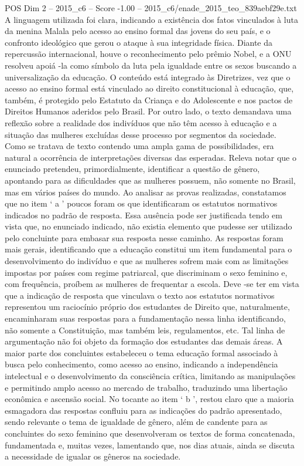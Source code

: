 \begin{textsample}{POS Dim 2 – 2015\_c6 – Score -1.00 – 2015\_c6/enade\_2015\_teo\_839aebf29e.txt}
A linguagem utilizada foi clara, indicando a existência dos fatos vinculados à luta da menina Malala pelo acesso ao ensino formal das jovens do seu país, e o confronto ideológico que gerou o ataque à sua integridade física.
Diante da repercussão internacional, houve o reconhecimento pelo prêmio Nobel, e a ONU resolveu apoiá -la como símbolo da luta pela igualdade entre os sexos buscando a universalização da educação.
O conteúdo está integrado às Diretrizes, vez que o acesso ao ensino formal está vinculado ao direito constitucional à educação, que, também, é protegido pelo Estatuto da Criança e do Adolescente e nos pactos de Direitos Humanos aderidos pelo Brasil.
Por outro lado, o texto demandava uma reflexão sobre a realidade dos indivíduos que não têm acesso à educação e a situação das mulheres excluídas desse processo por segmentos da sociedade.
Como se tratava de texto contendo uma ampla gama de possibilidades, era natural a ocorrência de interpretações diversas das esperadas.
Releva notar que o enunciado pretendeu, primordialmente, identificar a questão de gênero, apontando para as dificuldades que as mulheres possuem, não somente no Brasil, mas em vários países do mundo.
Ao analisar as provas realizadas, constatamos que no item ‘ a ’ poucos foram os que identificaram os estatutos normativos indicados no padrão de resposta.
Essa ausência pode ser justificada tendo em vista que, no enunciado indicado, não existia elemento que pudesse ser utilizado pelo concluinte para embasar sua resposta nesse caminho.
As respostas foram mais gerais, identificando que a educação constitui um item fundamental para o desenvolvimento do indivíduo e que as mulheres sofrem mais com as limitações impostas por países com regime patriarcal, que discriminam o sexo feminino e, com frequência, proíbem as mulheres de frequentar a escola.
Deve -se ter em vista que a indicação de resposta que vinculava o texto aos estatutos normativos representou um raciocínio próprio dos estudantes de Direito que, naturalmente, encaminharam suas respostas para a fundamentação nessa linha identificando, não somente a Constituição, mas também leis, regulamentos, etc.
Tal linha de argumentação não foi objeto da formação dos estudantes das demais áreas.
A maior parte dos concluintes estabeleceu o tema educação formal associado à busca pelo conhecimento, como acesso ao ensino, indicando a independência intelectual e o desenvolvimento da consciência crítica, limitando as manipulações e permitindo amplo acesso ao mercado de trabalho, traduzindo uma libertação econômica e ascensão social.
No tocante ao item ‘ b ’, restou claro que a maioria esmagadora das respostas confluiu para as indicações do padrão apresentado, sendo relevante o tema de igualdade de gênero, além de candente para as concluintes do sexo feminino que desenvolveram os textos de forma concatenada, fundamentada e, muitas vezes, lamentando que, nos dias atuais, ainda se discuta a necessidade de igualar os gêneros na sociedade.

\end{textsample}
